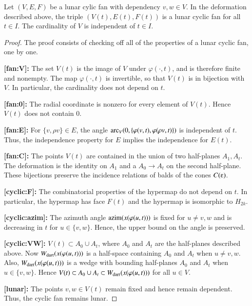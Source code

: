 \begin{lemma}\label{lemma:lunar-deform} 
Let $(V,E,F)$ be a lunar cylic fan with dependency $v,w\in V$.  In the deformation described above, the triple $(V(t),E(t),F(t))$ is a lunar cyclic fan for all $t\in I$.  The cardinality of $V$ is independent of $t\in I$.
\end{lemma}

\begin{proof}  The proof consists of checking off all of the properties of a lunar cyclic fan, one by one.  

{\bf [fan:V]:} The set $V(t)$ is the image of $V$ under $\varphi(\cdot,t)$, and is therefore finite and nonempty.  The map $\varphi(\cdot,t)$ is invertible, so that $V(t)$ is in bijection with $V$.  In particular, the cardinality does not depend on $t$.

{\bf [fan:0]:} The radial coordinate is nonzero for every element of $V(t)$.  Hence $V(t)$ does not contain $0$.

{\bf [fan:E]:} For $\{v,\rho v\}\in E$, the angle 
${\operatorname{arc}}_V(0,\{\varphi(v,t),\varphi(\rho v,t)\})$
is independent of $t$.  Thus, the independence property for $E$ implies
the independence for $E(t)$.

{\bf [fan:C]:} The points $V(t)$ are contained in the union of two half-planes $A_1,A_t$.  The deformation is the identity on $A_1$ and a $A_0\to A_t$ on the second half-plane.  These bijections preserve the incidence relations of balds of the cones $C(\e)$.  

{\bf [cyclic:F]:} The combinatorial properties of the hypermap do not depend on $t$.  In particular, the hypermap has face $F(t)$ and the hypermap is isomorphic to $H_{2k}$.

{\bf [cyclic:azim]:} The azimuth angle ${\operatorname{azim}}(x(\varphi(u,t)))$ is fixed for $u\ne v,w$ and is decreasing in $t$ for $u\in \{v,w\}$.  Hence, the upper bound on the angle is preserved.

{\bf [cyclic:VW]:} $V(t)\subset A_0\cup A_t$, where $A_0$ and $A_t$ are the
half-planes described above.  Now $W_{\text{dart}}(x(\varphi(u,t)))$ is a half-space containing $A_0$ and $A_t$ when $u\ne v,w$.  Also, $W_{\text{dart}}(x(\varphi(u,t)))$ is a wedge with bounding half-planes $A_0$ and $A_t$ when $u\in \{v,w\}$.  Hence
$V(t)\subset A_0\cup A_t\subset W_{\text{dart}}(x(\varphi(u,t)))$ for all $u\in V$.

{\bf [lunar]:} The points $v,w\in V(t)$ remain fixed and hence remain dependent.  Thus, the cyclic fan remains lunar.  
\end{proof}

